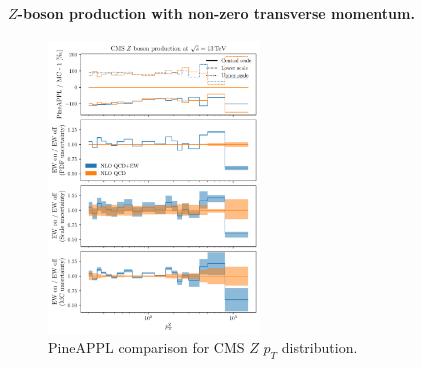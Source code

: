 \paragraph{$Z$-boson production with non-zero transverse momentum.}


\begin{figure}[!t]
    \centering
    \includegraphics[width=0.5\textwidth]{figures/pineappl_CMS_Z_13_TEV}
    \caption{PineAPPL comparison for CMS $Z$ $p_T$ distribution.}
    \label{fig:cmsZ13TeV}
\end{figure}


